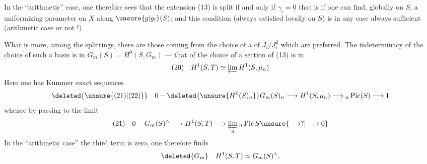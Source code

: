 In the ``arithmetic'' case, one therefore sees that the extension (13) is split if and only if $\gamma_i=0$ that is if one can find, globally on $S$, a uniformizing parameter on $X$ along $\unsure{g|g_i}(S)$; and this condition (always satisfied locally on $S$) is in any case always sufficient (arithmetic case or not !)

What is more, among the splittings, there are those coming from the choice of a  of $J_i/J_i^2$ which are preferred. The indeterminacy of the choice of such a basis is in $G_m(S)=H^0(S,G_m)$ --- that of the choice of a section of (13) is in
\[
(20)\quad H^1(S,T)\simeq\varprojlim H^1(S,\mu_n)
\]
Here one has Kummer exact sequences
\[
\deleted{\unsure{(21)|(22)}}\quad 0-\deleted{\unsure{H^0(S)_n}}G_m(S)_n\longrightarrow H^1(S,\mu_n)\longrightarrow{}_n\operatorname{Pic}(S)\longrightarrow1
\]
whence by passing to the limit
\[
(21)\quad 0-G_m(S)^\wedge\longrightarrow H^1(S,T)\longrightarrow\varprojlim_n{}_n\operatorname{Pic}S\unsure{\longrightarrow?|\longrightarrow0}
\]
In the ``arithmetic case'' the third term is zero, one therefore finds
\[
\deleted{G_m}\quad H^1(S,T)\simeq G_m(S)^\wedge.
\]
